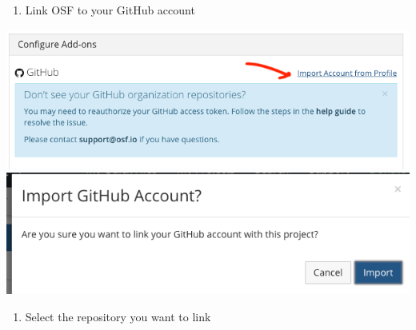 \documentclass[]{book}
\providecommand{\tightlist}{%
  \setlength{\itemsep}{0pt}\setlength{\parskip}{0pt}}
\begin{document}
\begin{enumerate}
\def\labelenumi{\arabic{enumi}.}
\setcounter{enumi}{4}
\tightlist
\item
  Link OSF to your GitHub account
\end{enumerate}

\includegraphics{images/research_protocols/osf/5.png}
\includegraphics{images/research_protocols/osf/6.png}

\begin{enumerate}
\def\labelenumi{\arabic{enumi}.}
\setcounter{enumi}{5}
\tightlist
\item
  Select the repository you want to link
\end{enumerate}
\end{document}
